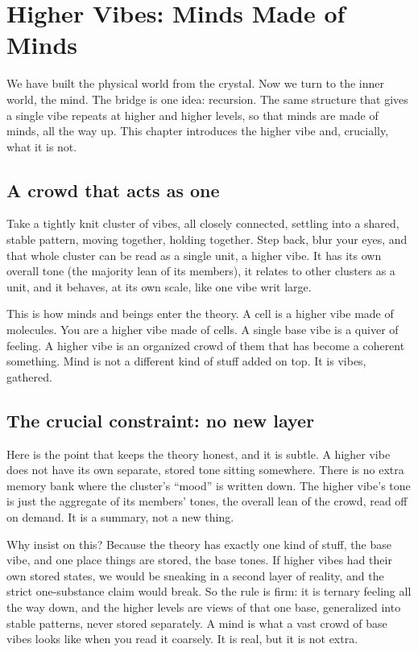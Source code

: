 \section{Higher Vibes: Minds Made of Minds}

We have built the physical world from the crystal. Now we turn to the inner world, the mind. The bridge is one idea: recursion. The same structure that gives a single vibe repeats at higher and higher levels, so that minds are made of minds, all the way up. This chapter introduces the higher vibe and, crucially, what it is not.

\subsection{A crowd that acts as one}

Take a tightly knit cluster of vibes, all closely connected, settling into a shared, stable pattern, moving together, holding together. Step back, blur your eyes, and that whole cluster can be read as a single unit, a higher vibe. It has its own overall tone (the majority lean of its members), it relates to other clusters as a unit, and it behaves, at its own scale, like one vibe writ large.

This is how minds and beings enter the theory. A cell is a higher vibe made of molecules. You are a higher vibe made of cells. A single base vibe is a quiver of feeling. A higher vibe is an organized crowd of them that has become a coherent something. Mind is not a different kind of stuff added on top. It is vibes, gathered.

\subsection{The crucial constraint: no new layer}

Here is the point that keeps the theory honest, and it is subtle. A higher vibe does not have its own separate, stored tone sitting somewhere. There is no extra memory bank where the cluster's ``mood'' is written down. The higher vibe's tone is just the aggregate of its members' tones, the overall lean of the crowd, read off on demand. It is a summary, not a new thing.

Why insist on this? Because the theory has exactly one kind of stuff, the base vibe, and one place things are stored, the base tones. If higher vibes had their own stored states, we would be sneaking in a second layer of reality, and the strict one-substance claim would break. So the rule is firm: it is ternary feeling all the way down, and the higher levels are views of that one base, generalized into stable patterns, never stored separately. A mind is what a vast crowd of base vibes looks like when you read it coarsely. It is real, but it is not extra.

